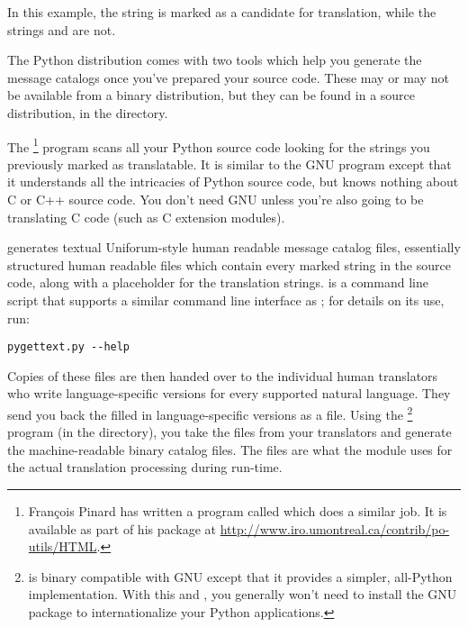 In this example, the string  is marked as
a candidate for translation, while the strings  and
 are not.

The Python distribution comes with two tools which help you generate
the message catalogs once you've prepared your source code.  These may
or may not be available from a binary distribution, but they can be
found in a source distribution, in the  directory.

The \footnote{Fran\c cois Pinard has
written a program called
 which does a similar job.  It is available as part of
his  package at
\url{http://www.iro.umontreal.ca/contrib/po-utils/HTML}.} program
scans all your Python source code looking for the strings you
previously marked as translatable.  It is similar to the GNU
 program except that it understands all the
intricacies of Python source code, but knows nothing about C or C++
source code.  You don't need GNU  unless you're also
going to be translating C code (such as C extension modules).

 generates textual Uniforum-style human readable
message catalog  files, essentially structured human
readable files which contain every marked string in the source code,
along with a placeholder for the translation strings.
 is a command line script that supports a similar
command line interface as ; for details on its use,
run:

\begin{verbatim}
pygettext.py --help
\end{verbatim}

Copies of these  files are then handed over to the
individual human translators who write language-specific versions for
every supported natural language.  They send you back the filled in
language-specific versions as a  file.  Using the
\footnote{ is binary
compatible with GNU  except that it provides a
simpler, all-Python implementation.  With this and
, you generally won't need to install the GNU
 package to internationalize your Python
applications.} program (in the  directory), you take the
 files from your translators and generate the
machine-readable  binary catalog files.  The 
files are what the  module uses for the actual
translation processing during run-time.

